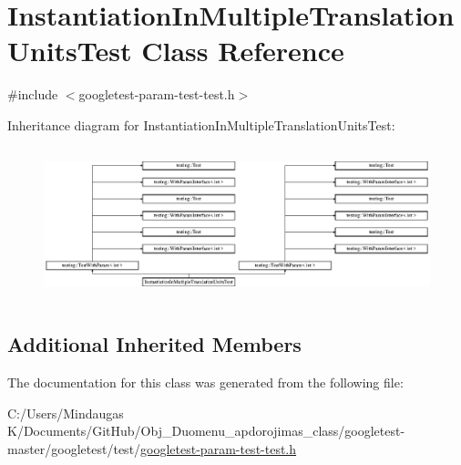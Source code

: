 \hypertarget{class_instantiation_in_multiple_translation_units_test}{}\section{Instantiation\+In\+Multiple\+Translation\+Units\+Test Class Reference}
\label{class_instantiation_in_multiple_translation_units_test}


{\ttfamily \#include $<$googletest-\/param-\/test-\/test.\+h$>$}

Inheritance diagram for Instantiation\+In\+Multiple\+Translation\+Units\+Test\+:\begin{figure}[H]
\begin{center}
\leavevmode
\includegraphics[height=4.444444cm]{d9/d8a/class_instantiation_in_multiple_translation_units_test}
\end{center}
\end{figure}
\subsection*{Additional Inherited Members}


The documentation for this class was generated from the following file\+:\begin{DoxyCompactItemize}
\item 
C\+:/\+Users/\+Mindaugas K/\+Documents/\+Git\+Hub/\+Obj\+\_\+\+Duomenu\+\_\+apdorojimas\+\_\+class/googletest-\/master/googletest/test/\mbox{\hyperlink{googletest-master_2googletest_2test_2googletest-param-test-test_8h}{googletest-\/param-\/test-\/test.\+h}}\end{DoxyCompactItemize}
